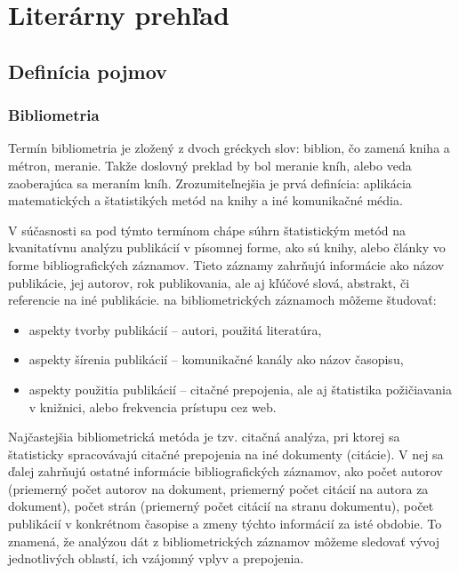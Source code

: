 \chapter{Literárny prehľad}
\setcounter{page}{1}

\section{Definícia pojmov}

\subsection{Bibliometria}

Termín bibliometria je zložený z dvoch gréckych slov: biblion, čo zamená kniha a
métron, meranie.  Takže doslovný preklad by bol meranie kníh, alebo veda
zaoberajúca sa meraním kníh.  Zrozumiteľnejšia je prvá definícia: aplikácia
matematických a štatistikých metód na knihy a iné komunikačné
média. \citet{Pritchard1969}

V súčasnosti sa pod týmto termínom chápe súhrn štatistickým metód na
kvanitatívnu analýzu publikácií v písomnej forme, ako sú knihy, alebo články vo
forme bibliografických záznamov.  Tieto záznamy zahrňujú informácie ako názov
publikácie, jej autorov, rok publikovania, ale aj kľúčové slová, abstrakt, či
referencie na iné publikácie.  na bibliometrických záznamoch môžeme študovať:

\begin{itemize}
\item aspekty tvorby publikácií -- autori, použitá literatúra,
\item aspekty šírenia publikácií -- komunikačné kanály ako názov časopisu,
\item aspekty použitia publikácií -- citačné prepojenia, ale aj štatistika
  požičiavania v knižnici, alebo frekvencia prístupu cez web.  \citet{Ondrisova2011}
\end{itemize}

Najčastejšia bibliometrická metóda je tzv.  citačná analýza, pri ktorej sa
štatisticky spracovávajú citačné prepojenia na iné dokumenty (citácie).  V nej
sa ďalej zahrňujú ostatné informácie bibliografických záznamov, ako počet
autorov (priemerný počet autorov na dokument, priemerný počet citácií na autora
za dokument), počet strán (priemerný počet citácií na stranu dokumentu), počet
publikácií v konkrétnom časopise a zmeny týchto informácií za isté obdobie.  To
znamená, že analýzou dát z bibliometrických záznamov môžeme sledovať vývoj
jednotlivých oblastí, ich vzájomný vplyv a prepojenia.

